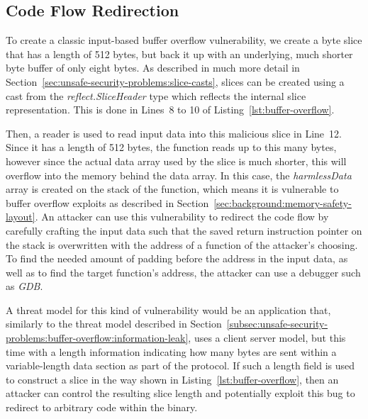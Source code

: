 
\subsection{Code Flow Redirection}\label{subsec:unsafe-security-problems:buffer-overflow:code-flow-redirection}

To create a classic input-based buffer overflow vulnerability, we create a byte slice that has a length of 512 bytes,
but back it up with an underlying, much shorter byte buffer of only eight bytes.
As described in much more detail in Section~\ref{sec:unsafe-security-problems:slice-casts}, slices can be created using
a cast from the \textit{reflect.SliceHeader} type which reflects the internal slice representation.
This is done in Lines~8 to 10 of Listing~\ref{lst:buffer-overflow}.



Then, a reader is used to read input data into this malicious slice in Line~12.
Since it has a length of 512 bytes, the function reads up to this many bytes, however since the actual data array used
by the slice is much shorter, this will overflow into the memory behind the data array.
In this case, the \textit{harmlessData} array is created on the stack of the function, which means it is vulnerable to
buffer overflow exploits as described in Section~\ref{sec:background:memory-safety-layout}.
An attacker can use this vulnerability to redirect the code flow by carefully crafting the input data such that the
saved return instruction pointer on the stack is overwritten with the address of a function of the attacker's choosing.
To find the needed amount of padding before the address in the input data, as well as to find the target function's
address, the attacker can use a debugger such as \textit{GDB}.

A threat model for this kind of vulnerability would be an application that, similarly to the threat model described in
Section~\ref{subsec:unsafe-security-problems:buffer-overflow:information-leak}, uses a client server model, but this
time with a length information indicating how many bytes are sent within a variable-length data section as part of the
protocol.
If such a length field is used to construct a slice in the way shown in Listing~\ref{lst:buffer-overflow}, then an
attacker can control the resulting slice length and potentially exploit this bug to redirect to arbitrary code within
the binary.


